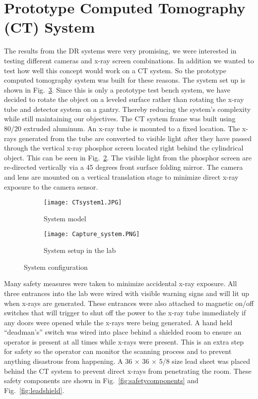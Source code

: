 \section{Prototype Computed Tomography (CT) System}
The results from the DR systems were very promising, we were interested in testing different cameras and x-ray screen combinations.  In addition we wanted to test how well this concept would work on a CT system.  So the prototype computed tomography system was built for these reasons.  The system set up is shown in Fig.~\ref{fig:CTsystem}.  Since this is only a prototype test bench system, we have decided to rotate the object on a leveled surface rather than rotating the x-ray tube and detector system on a gantry.  Thereby reducing the system's complexity while still maintaining our objectives.  The CT system frame was built using 80/20 extruded aluminum.  An x-ray tube is mounted to a fixed location.  The x-rays generated from the tube are converted to visible light after they have passed through the vertical x-ray phosphor screen located right behind the cylindrical object.  This can be seen in Fig.~\ref{fig:CTlab}.  The visible light from the phosphor screen are re-directed vertically via a 45 degrees front surface folding mirror.  The camera and lens are mounted on a vertical translation stage to minimize direct x-ray exposure to the camera sensor.

\begin{figure}[h]
	\begin{subfigure}[b]{0.45\linewidth}
	\centering
	\texttt{[image: CTsystem1.JPG]}
	\caption{System model}
	\label{fig:CTmodel}
	\end{subfigure}
\hspace{1 cm}
	\begin{subfigure}[b]{0.45\linewidth}
	\centering
	\texttt{[image: Capture\_system.PNG]}
	\caption{System setup in the lab}
	\label{fig:CTlab}
	\end{subfigure}
\caption{System configuration}
\label{fig:CTsystem}
\end{figure}

Many safety measures were taken to minimize accidental x-ray exposure.  All three entrances into the lab were wired with visible warning signs and will lit up when x-rays are generated.  These entrances were also attached to magnetic on/off switches that will trigger to shut off the power to the x-ray tube immediately if any doors were opened while the x-rays were being generated.  A hand held ``deadman's'' switch was wired into place behind a shielded room to ensure an operator is present at all times while x-rays were present.  This is an extra step for safety so the operator can monitor the scanning process and to prevent anything disastrous from happening.  A 36 \inches $\times$ 36 \inches $\times$ 5/8 \inches size lead sheet was placed behind the CT system to prevent direct x-rays from penetrating the room.  These safety components are shown in Fig.~\ref{fig:safetycomponents} and Fig.~\ref{fig:leadshield}.

